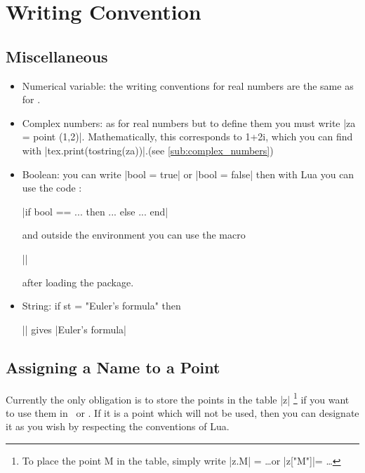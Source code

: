 \newpage

\section{Writing Convention} %
\label{sec:writing_convention}

\subsection{Miscellaneous} %
\label{sub:miscellanous}

\begin{itemize}
   \item Numerical variable: the writing conventions for real numbers are the same as for .
   \item Complex numbers: as for real numbers but to define them you must write |za = point (1,2)|. Mathematically, this corresponds to 1+2i, which you can find with |tex.print(tostring(za))|.(see \ref{sub:complex_numbers})
   \item Boolean: you can write |bool = true| or |bool = false| then with Lua you can use the code :\\
 \begin{mybox}
|if bool == ... then ... else ... end|
\end{mybox}
 
 and outside the environment  you can use the macro 
\begin{mybox}
 ||
\end{mybox}

     after loading the  package.
   
   \item String: if st = "Euler's formula" then \begin{mybox}
      || gives |Euler's formula|
   \end{mybox}
   

\end{itemize}

\subsection{Assigning a Name to a Point} %
\label{sub:assigning_a_name_to_a_point}

Currently the only obligation is to store the points in the table |z| \footnote{To place the point M in the table, simply write |z.M| = \ldots or |z["M"]|= \ldots} if you want to use them in \TIKZ\ or . If it is a point which will not be used, then you can designate it as you wish by respecting the conventions of Lua. 

